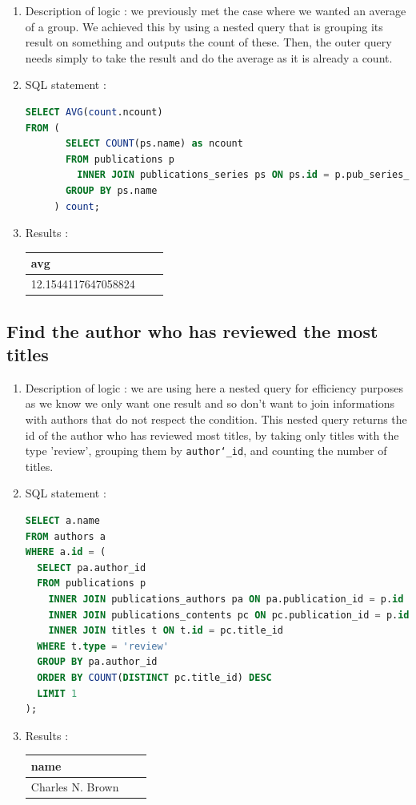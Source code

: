\documentclass[doubleside, titlepage]{article}
\begin{document}
	\begin{enumerate}
	\item Description of logic : we previously met the case where we wanted an average of a group. We achieved this by using a nested query that is grouping its result on something and outputs the count of these. Then, the outer query needs simply to take the result and do the average as it is already a count.
	\item SQL statement :
		\begin{lstlisting}[language=SQL,showspaces=false,basicstyle=\ttfamily,numberstyle=\tiny,commentstyle=\color{gray}]
SELECT AVG(count.ncount)
FROM (
       SELECT COUNT(ps.name) as ncount
       FROM publications p
         INNER JOIN publications_series ps ON ps.id = p.pub_series_id
       GROUP BY ps.name
     ) count;
		\end{lstlisting}

	\item Results :\\

	\begin{tabular}{|l|c|r|}
	  \hline
		avg\\
	  \hline
		12.1544117647058824\\
	  \hline
	\end{tabular}
\end{enumerate}

\subsection{Find the author who has reviewed the most titles}

	\begin{enumerate}
	\item Description of logic : we are using here a nested query for efficiency purposes as we know we only want one result and so don't want to join informations with authors that do not respect the condition. This nested query returns the id of the author who has reviewed most titles, by taking only titles with the type 'review', grouping them by \texttt{author\char`_id}, and counting the number of titles.
	\item SQL statement :
		\begin{lstlisting}[language=SQL,showspaces=false,basicstyle=\ttfamily,numberstyle=\tiny,commentstyle=\color{gray}]
SELECT a.name
FROM authors a
WHERE a.id = (
  SELECT pa.author_id
  FROM publications p
    INNER JOIN publications_authors pa ON pa.publication_id = p.id
    INNER JOIN publications_contents pc ON pc.publication_id = p.id
    INNER JOIN titles t ON t.id = pc.title_id
  WHERE t.type = 'review'
  GROUP BY pa.author_id
  ORDER BY COUNT(DISTINCT pc.title_id) DESC
  LIMIT 1
);
		\end{lstlisting}

	\item Results :\\

	\begin{tabular}{|l|c|r|}
	  \hline
		name\\
	  \hline
		Charles N. Brown\\
	  \hline
	\end{tabular}
\end{enumerate}
\end{document}
